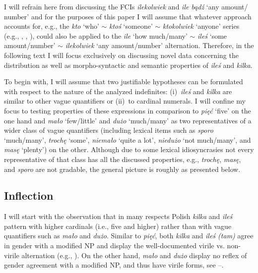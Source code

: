 \documentclass[output=paper,
]{langscibook}
\begin{document}
	I will refrain here from discussing the FCIs \textit{ilekolwiek} and \textit{ile bądź} `any amount/ number' and for the purposes of this paper I will assume that whatever approach accounts for, e.g., the \textit{kto} `who' $\sim$ \textit{ktoś} `someone' $\sim$ \textit{ktokolwiek} `anyone' series (e.g., \citealt{kadmon_landman1993any}, \citealt{aloni2007free}, \citealt{chierchia2013logic}), could also be applied to the \textit{ile} `how much/many' $\sim$ \textit{ileś} `some amount/number' $\sim$ \textit{ilekolwiek} `any amount/number' alternation. Therefore, in the following text I will focus exclusively on discussing novel data concerning the distribution as well as morpho-syntactic and semantic properties of \textit{ileś} and \textit{kilka}. 
	
	To begin with, I will assume that two justifiable hypotheses can be formulated with respect to the nature of the analyzed indefinites: (i)~\textit{ileś} and \textit{kilka} are similar to other vague quantifiers or (ii)~to cardinal numerals. I will confine my focus to testing properties of these expressions in comparison to \textit{pięć} `five' on the one hand and \textit{mało} `few/little' and \textit{dużo} `much/many' as two representatives of a wider class of vague quantifiers (including lexical items such as \textit{sporo} `much/many', \textit{trochę} `some', \textit{niemało} `quite a lot', \textit{niedużo} `not much/many', and \textit{masę} `plenty') on the other. Although due to some lexical idiosyncrasies not every representative of that class has all the discussed properties, e.g., \textit{trochę}, \textit{masę}, and \textit{sporo} are not gradable, the general picture is roughly as presented below.
	
	\subsection{Inflection}\label{sec:inflection}
	
	I will start with the observation that in many respects Polish \textit{kilka} and \textit{ileś} pattern with higher cardinals (i.e., five and higher) rather than with vague quantifiers such as \textit{mało} and \textit{dużo}. Similar to \textit{pięć}, both \textit{kilka} and \textit{ileś (tam)} agree in gender with a modified NP and display the well-documented virile vs. non-virile alternation (e.g., \citealt{miechowicz-mathiasen2011syntax}). On the other hand, \textit{mało} and \textit{dużo} display no reflex of gender agreement with a modified NP, and thus have virile forms, see --.
	
\end{document}
